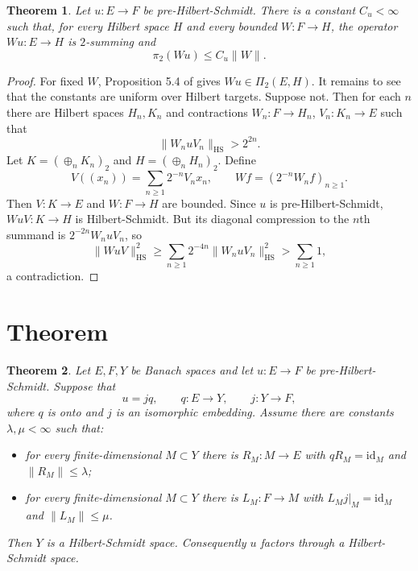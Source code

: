 \documentclass[11pt]{amsart}
\newtheorem{theorem}{Theorem}
\begin{document}
\begin{theorem}
Let $u:E\to F$ be pre-Hilbert-Schmidt. There is a constant $C_u<\infty$
such that, for every Hilbert space $H$ and every bounded $W:F\to H$,
the operator $Wu:E\to H$ is $2$-summing and
\[
  \pi_2(Wu)\le C_u\|W\|.
\]
\end{theorem}

\begin{proof}
For fixed $W$, Proposition 5.4 of \cite{AEH} gives $Wu\in\Pi_2(E,H)$.
It remains to see that the constants are uniform over Hilbert targets.
Suppose not. Then for each $n$ there are Hilbert spaces $H_n,K_n$ and
contractions $W_n:F\to H_n$, $V_n:K_n\to E$ such that
\[
  \|W_nuV_n\|_{\mathrm{HS}}>2^{2n}.
\]
Let $K=(\oplus_n K_n)_2$ and $H=(\oplus_n H_n)_2$. Define
\[
  V((x_n))=\sum_{n\ge 1}2^{-n}V_nx_n,\qquad
  Wf=(2^{-n}W_nf)_{n\ge 1}.
\]
Then $V:K\to E$ and $W:F\to H$ are bounded. Since $u$ is
pre-Hilbert-Schmidt, $WuV:K\to H$ is Hilbert-Schmidt. But its
diagonal compression to the $n$th summand is
$2^{-2n}W_nuV_n$, so
\[
  \|WuV\|_{\mathrm{HS}}^2
  \ge \sum_{n\ge 1} 2^{-4n}\|W_nuV_n\|_{\mathrm{HS}}^2
  > \sum_{n\ge 1}1,
\]
a contradiction.
\end{proof}

\section*{Theorem}

\begin{theorem}
Let $E,F,Y$ be Banach spaces and let $u:E\to F$ be
pre-Hilbert-Schmidt. Suppose that
\[
  u = j q,\qquad q:E\to Y,\qquad j:Y\to F,
\]
where $q$ is onto and $j$ is an isomorphic embedding. Assume there are
constants $\lambda,\mu<\infty$ such that:
\begin{itemize}
\item for every finite-dimensional $M\subset Y$ there is
  $R_M:M\to E$ with $qR_M=\mathrm{id}_M$ and $\|R_M\|\le\lambda$;
\item for every finite-dimensional $M\subset Y$ there is
  $L_M:F\to M$ with $L_Mj|_M=\mathrm{id}_M$ and $\|L_M\|\le\mu$.
\end{itemize}
Then $Y$ is a Hilbert-Schmidt space. Consequently $u$ factors through a
Hilbert-Schmidt space.
\end{theorem}
\end{document}
